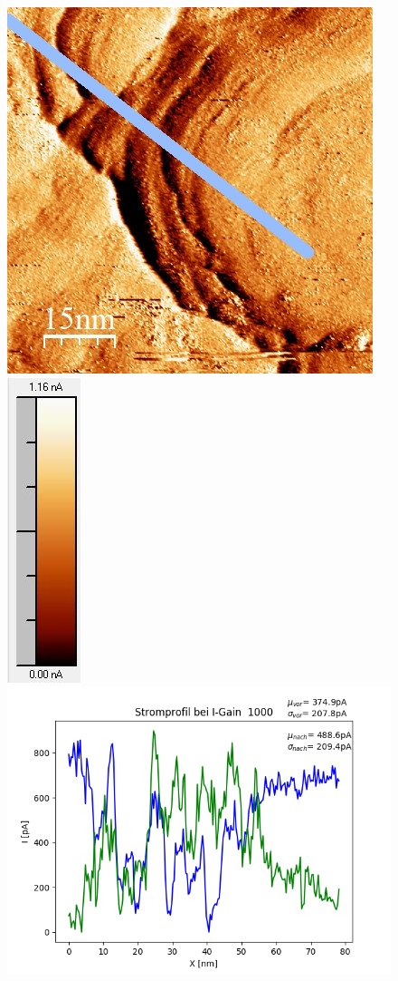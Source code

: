 \documentclass[12pt,a4paper]{article}
\begin{document}
\begin{figure}[H]
\includegraphics[scale=0.6]{Bilder/Anhang/IGain/Strom/1000_IGain_Strom_nach.jpg}
\includegraphics[scale=0.6]{Bilder/Anhang/IGain/Strom/1000_IGain_Strom_nach_Skala.jpg}
\includegraphics[scale=0.5]{Bilder/Anhang/IGain/Strom/Strom_Profil_IGain_1000.png}

\end{figure}
\end{document}
